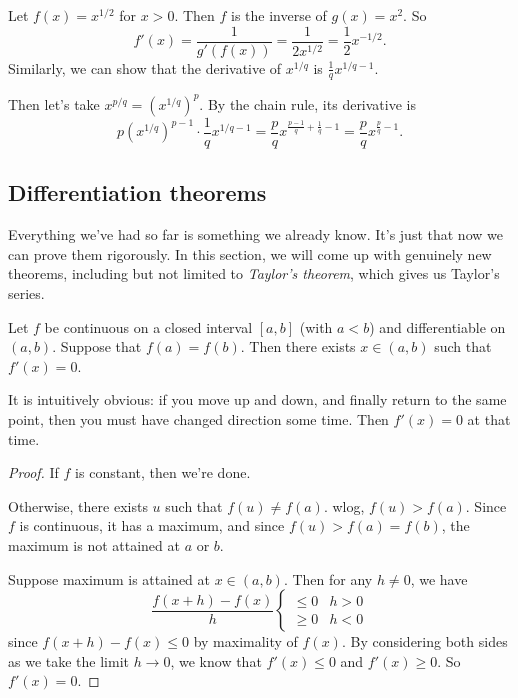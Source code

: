 \documentclass[a4paper]{article}
\begin{document}
\begin{eg}
  Let $f(x) = x^{1/2}$ for $x > 0$. Then $f$ is the inverse of $g(x) = x^2$. So
  \[
    f'(x) = \frac{1}{g'(f(x))} = \frac{1}{2x^{1/2}} = \frac{1}{2}x^{-1/2}.
  \]
  Similarly, we can show that the derivative of $x^{1/q}$ is $\frac{1}{q}x^{1/q - 1}$.

  Then let's take $x^{p/q} = (x^{1/q})^p$. By the chain rule, its derivative is
  \[
    p(x^{1/q})^{p - 1}\cdot \frac{1}{q}x^{1/q - 1} = \frac{p}{q}x^{\frac{p - 1}{q} + \frac{1}{q} - 1} = \frac{p}{q}x^{\frac{p}{q} - 1}.
  \]
\end{eg}

\subsection{Differentiation theorems}
Everything we've had so far is something we already know. It's just that now we can prove them rigorously. In this section, we will come up with genuinely new theorems, including but not limited to \emph{Taylor's theorem}, which gives us Taylor's series.

\begin{thm}
  Let $f$ be continuous on a closed interval $[a, b]$ (with $a < b$) and differentiable on $(a, b)$. Suppose that $f(a) = f(b)$. Then there exists $x\in (a, b)$ such that $f'(x) = 0 $.
\end{thm}
It is intuitively obvious: if you move up and down, and finally return to the same point, then you must have changed direction some time. Then $f'(x) = 0$ at that time.

\begin{proof}
  If $f$ is constant, then we're done.

  Otherwise, there exists $u$ such that $f(u) \not= f(a)$. wlog, $f(u) > f(a)$. Since $f$ is continuous, it has a maximum, and since $f(u) > f(a) = f(b)$, the maximum is not attained at $a$ or $b$.

  Suppose maximum is attained at $x\in (a, b)$. Then for any $h \not = 0$, we have
  \[
    \frac{f(x + h) - f(x)}{h}
    \begin{cases}
      \leq 0 & h > 0\\
      \geq 0 & h < 0
    \end{cases}
  \]
  since $f(x + h) - f(x) \leq 0$ by maximality of $f(x)$. By considering both sides as we take the limit $h\to 0$, we know that $f'(x) \leq 0$ and $f'(x) \geq 0$. So $f'(x) = 0$.
\end{proof}
\end{document}
